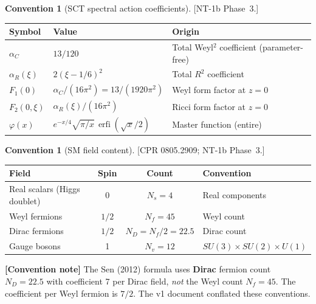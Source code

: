 \documentclass[12pt,a4paper]{article}
\theoremstyle{definition}
\newtheorem{convention}[proposition]{Convention}
\theoremstyle{remark}
\newcommand{\erfi}{\operatorname{erfi}}
\newcommand{\fromlit}[1]{\textcolor{blue!70!black}{\textsf{[#1]}}}
\newcommand{\signcorrection}[1]{%
  \par\noindent\colorbox{red!10}{%
    \parbox{\dimexpr\linewidth-2\fboxsep}{%
      \textcolor{red!50!black}{\textbf{[Convention note]}}
      \textcolor{red!50!black}{#1}%
    }%
  }\par%
}
\begin{document}
\begin{convention}[SCT spectral action coefficients]\label{conv:sct}
\fromlit{NT-1b Phase~3.}
\begin{center}
\begin{tabular}{lll}
\toprule
Symbol & Value & Origin \\
\midrule
$\alpha_C$ & $13/120$ & Total Weyl${}^2$ coefficient (parameter-free) \\
$\alpha_R(\xi)$ & $2(\xi - 1/6)^2$ & Total $R^2$ coefficient \\
$F_1(0)$ & $\alpha_C/(16\pi^2) = 13/(1920\pi^2)$ & Weyl form factor at $z=0$ \\
$F_2(0,\xi)$ & $\alpha_R(\xi)/(16\pi^2)$ & Ricci form factor at $z=0$ \\
$\varphi(x)$ & $e^{-x/4}\sqrt{\pi/x}\,\erfi(\sqrt{x}/2)$ & Master function (entire) \\
\bottomrule
\end{tabular}
\end{center}
\end{convention}

\begin{convention}[SM field content]\label{conv:SM}
\fromlit{CPR 0805.2909; NT-1b Phase~3.}
\begin{center}
\begin{tabular}{lccl}
\toprule
Field & Spin & Count & Convention \\
\midrule
Real scalars (Higgs doublet) & 0 & $N_s = 4$ & Real components \\
Weyl fermions & $1/2$ & $N_f = 45$ & Weyl count \\
Dirac fermions & $1/2$ & $N_D = N_f/2 = 22.5$ & Dirac count \\
Gauge bosons & 1 & $N_v = 12$ & $SU(3)\times SU(2)\times U(1)$ \\
\bottomrule
\end{tabular}
\end{center}
\signcorrection{The Sen (2012) formula uses \textbf{Dirac} fermion count
$N_D = 22.5$ with coefficient 7 per Dirac field, \emph{not} the Weyl
count $N_f = 45$.  The coefficient per Weyl fermion is $7/2$.  The v1
document conflated these conventions.}
\end{convention}
\end{document}
